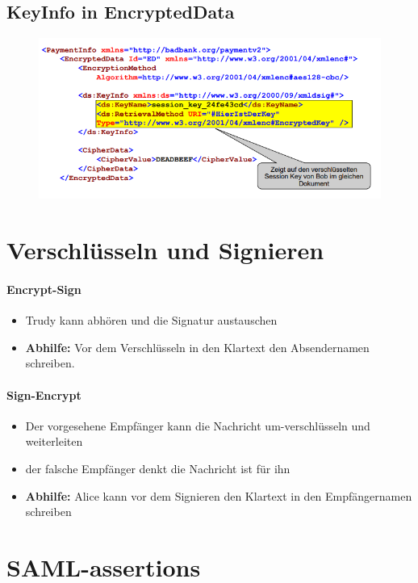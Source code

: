 \subsection{KeyInfo in EncryptedData}
\begin{figure}[H]
	\begin{center}
		\includegraphics[scale=0.8]{Resources/XmlEncrypt4}
		\caption{}
		\label{fig:XmlEncrypt4}
	\end{center}
\end{figure}

\section{Verschlüsseln und Signieren}
\paragraph{Encrypt-Sign}
\begin{itemize}
	\item Trudy kann abhören und die Signatur austauschen
	\item \textbf{Abhilfe:} Vor dem Verschlüsseln in den Klartext den Absendernamen schreiben.
\end{itemize}

\paragraph{Sign-Encrypt}
\begin{itemize}
	\item Der vorgesehene Empfänger kann die Nachricht um-verschlüsseln und weiterleiten
	\item der falsche Empfänger denkt die Nachricht ist für ihn
	\item \textbf{Abhilfe:} Alice kann vor dem Signieren den Klartext in den Empfängernamen schreiben
\end{itemize}

\section{SAML-assertions}










